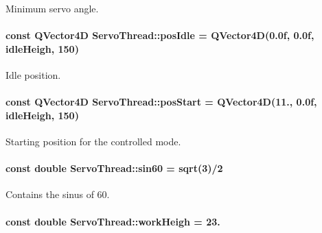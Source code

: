 Minimum servo angle. 

\hypertarget{a00009_a2f5ebef53b31216cb54235264ba9f8d0}{}
\paragraph[{pos\+Idle}]{\setlength{\rightskip}{0pt plus 5cm}const Q\+Vector4\+D Servo\+Thread\+::pos\+Idle = Q\+Vector4\+D(0.\+0f, 0.\+0f, idle\+Heigh, 150)\hspace{0.3cm}{\ttfamily [private]}}\label{a00009_a2f5ebef53b31216cb54235264ba9f8d0}


Idle position. 

\hypertarget{a00009_a67cca86496c9826987f2c543adf788be}{}
\paragraph[{pos\+Start}]{\setlength{\rightskip}{0pt plus 5cm}const Q\+Vector4\+D Servo\+Thread\+::pos\+Start = Q\+Vector4\+D(11., 0.\+0f, idle\+Heigh, 150)\hspace{0.3cm}{\ttfamily [private]}}\label{a00009_a67cca86496c9826987f2c543adf788be}


Starting position for the controlled mode. 

\hypertarget{a00009_aaa3e2dd194949b12f8a41ebd0d62fde9}{}
\paragraph[{sin60}]{\setlength{\rightskip}{0pt plus 5cm}const double Servo\+Thread\+::sin60 = sqrt(3)/2\hspace{0.3cm}{\ttfamily [private]}}\label{a00009_aaa3e2dd194949b12f8a41ebd0d62fde9}


Contains the sinus of 60. 

\hypertarget{a00009_a53758fdbbee450ab4cd5a3432725f056}{}
\paragraph[{work\+Heigh}]{\setlength{\rightskip}{0pt plus 5cm}const double Servo\+Thread\+::work\+Heigh = 23.\hspace{0.3cm}{\ttfamily [private]}}\label{a00009_a53758fdbbee450ab4cd5a3432725f056}


